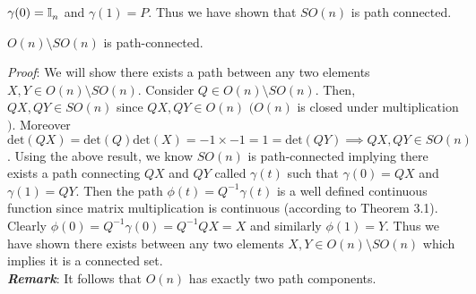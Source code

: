  $\gamma(0) = \mathbb{I}^{}_n$ and $\gamma(1) = P$. Thus we have shown that $SO(n)$ is path connected. 
\begin{theorem}
$O(n)\setminus SO(n)$ is path-connected.
\end{theorem}
\emph{Proof}: We will show there exists a path between any two elements $X, Y \in O(n)\setminus SO(n)$. Consider $Q \in O(n)\setminus SO(n)$. Then, $QX, QY \in SO(n)$ since $QX, QY \in O(n)$ $\bigl(O(n)$ is closed under multiplication$\bigr)$. Moreover $\mathrm{det}(QX) = \mathrm{det}(Q)\mathrm{det}(X) = -1\times-1 = 1 = \mathrm{det}(QY) \implies QX, QY \in SO(n)$. Using the above result, we know $SO(n)$ is path-connected implying there exists a path connecting $QX$ and $QY$ called $\gamma(t)$ such that $\gamma(0) = QX$ and $\gamma(1) = QY$. Then the path $\phi(t) = Q^{-1}\gamma(t)$ is a well defined continuous function since matrix multiplication is continuous (according to Theorem 3.1). Clearly $\phi(0) = Q^{-1}\gamma(0) = Q^{-1}QX = X$ and similarly $\phi(1) = Y$. Thus we have shown there exists between any two elements $X, Y \in O(n) \setminus SO(n)$ which implies it is a connected set. \\
\emph{\textbf{Remark}}: It follows that $O(n)$ has exactly two path components. 